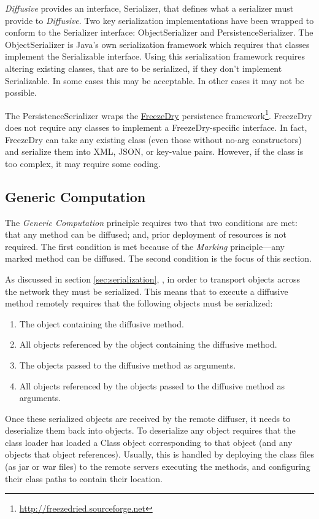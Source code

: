 \documentclass[11pt]{article}
\begin{document}
\emph{Diffusive} provides an interface, \textsf{Serializer}, that defines what a serializer must provide to \emph{Diffusive}. Two key serialization implementations have been wrapped to conform to the \textsf{Serializer} interface: \textsf{ObjectSerializer} and \textsf{PersistenceSerializer}. The \textsf{ObjectSerializer} is Java's own serialization framework which requires that classes implement the \textsf{Serializable} interface. Using this serialization framework requires altering existing classes, that are to be serialized, if they don't implement \textsf{Serializable}. In some cases this may be acceptable. In other cases it may not be possible.

The \textsf{PersistenceSerializer} wraps the \href{http://freezedried.sourceforge.net}{FreezeDry} persistence framework\footnote{\url{http://freezedried.sourceforge.net}}. FreezeDry does not require any classes to implement a FreezeDry-specific interface. In fact, FreezeDry can take any existing class (even those without no-arg constructors) and serialize them into XML, JSON, or key-value pairs. However, if the class is too complex, it may require some coding.

\subsection{Generic Computation\label{sec:generic_computation}}
The \emph{Generic Computation} principle requires two that two conditions are met: that any method can be diffused; and, prior deployment of resources is not required. The first condition is met because of the \emph{Marking} principle---any marked method can be diffused. The second condition is the focus of this section.

As discussed in section \ref{sec:serialization}, , in order to transport objects across the network they must be serialized. This means that to execute a diffusive method remotely requires that the following objects must be serialized:
\begin{enumerate}
\item The object containing the diffusive method.
\item All objects referenced by the object containing the diffusive method.
\item The objects passed to the diffusive method as arguments.
\item All objects referenced by the objects passed to the diffusive method as arguments.
\end{enumerate}
Once these serialized objects are received by the remote diffuser, it needs to deserialize them back into objects. To deserialize any object requires that the class loader has loaded a \textsf{Class} object corresponding to that object (and any objects that object references). Usually, this is handled by deploying the class files (as jar or war files) to the remote servers executing the methods, and configuring their class paths to contain their location.
\end{document}
